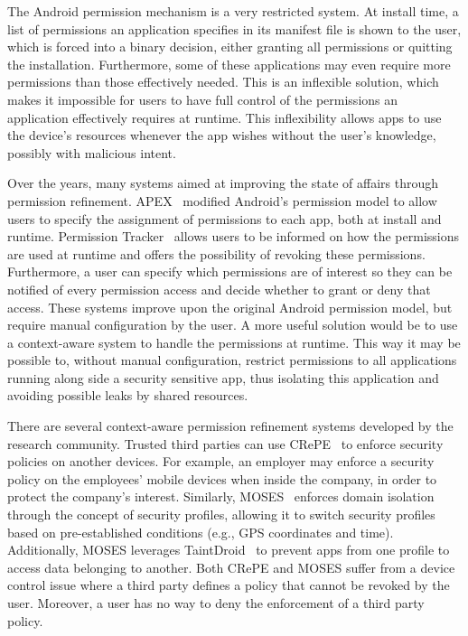 The Android permission mechanism is a very restricted system. At install time, a list of permissions an application specifies in its manifest file is shown to the user, which is forced into a binary decision, either granting all permissions or quitting the installation. Furthermore, some of these applications may even require more permissions than those effectively needed. This is an inflexible solution, which makes it impossible for users to have full control of the permissions an application effectively requires at runtime. This inflexibility allows apps to use the device's resources whenever the app wishes without the user's knowledge, possibly with malicious intent.

Over the years, many systems aimed at improving the state of affairs through permission refinement. APEX~\cite{nauman2010apex} modified Android's permission model to allow users to specify the assignment of permissions to each app, both at install and runtime. Permission Tracker~\cite{kern2012permission} allows users to be informed on how the permissions are used at runtime and offers the possibility of revoking these permissions. Furthermore, a user can specify which permissions are of interest so they can be notified of every permission access and decide whether to grant or deny that access. These systems improve upon the original Android permission model, but require manual configuration by the user. %
A more useful solution would be to use a context-aware system to handle the permissions at runtime. This way it may be possible to, without manual configuration, restrict permissions to all applications running along side a security sensitive app, thus isolating this application and avoiding possible leaks by shared resources.

There are several context-aware permission refinement systems developed by the research community. Trusted third parties can use CRePE~\cite{conti2011crepe} to enforce security policies on another devices. For example, an employer may enforce a security policy on the employees' mobile devices when inside the company, in order to protect the company's interest. Similarly, MOSES~\cite{russello2012moses} enforces domain isolation through the concept of security profiles, allowing it to switch security profiles based on pre-established conditions (e.g., GPS coordinates and time). Additionally, MOSES leverages TaintDroid~\cite{enck2014taintdroid} to prevent apps from one profile to access data belonging to another. Both CRePE and MOSES suffer from a device control issue where a third party defines a policy that cannot be revoked by the user. Moreover, a user has no way to deny the enforcement of a third party policy. 


